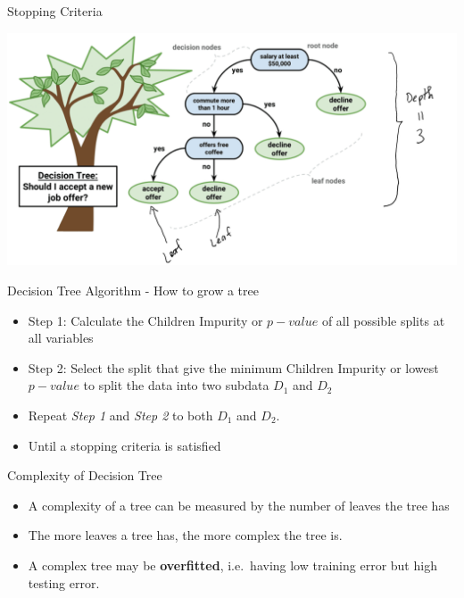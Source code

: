 \documentclass[
  ignorenonframetext,
]{beamer}
\providecommand{\tightlist}{%
  \setlength{\itemsep}{0pt}\setlength{\parskip}{0pt}}
\begin{document}
\begin{frame}{Stopping Criteria}
\protect\hypertarget{stopping-criteria-1}{}

\includegraphics{images2/tree6.png}

\end{frame}

\begin{frame}{Decision Tree Algorithm - How to grow a tree}
\protect\hypertarget{decision-tree-algorithm---how-to-grow-a-tree}{}

\begin{itemize}
\tightlist
\item
  Step 1: Calculate the Children Impurity or \(p-value\) of all possible
  splits at all variables
\item
  Step 2: Select the split that give the minimum Children Impurity or
  lowest \(p-value\) to split the data into two subdata \(D_1\) and
  \(D_2\)
\item
  Repeat \emph{Step 1} and \emph{Step 2} to both \(D_1\) and \(D_2\).
\item
  Until a stopping criteria is satisfied
\end{itemize}

\end{frame}

\begin{frame}{Complexity of Decision Tree}
\protect\hypertarget{complexity-of-decision-tree}{}

\begin{itemize}
\tightlist
\item
  A complexity of a tree can be measured by the number of leaves the
  tree has
\item
  The more leaves a tree has, the more complex the tree is.
\item
  A complex tree may be \textbf{overfitted}, i.e.~having low training
  error but high testing error.
\end{itemize}

\end{frame}
\end{document}
